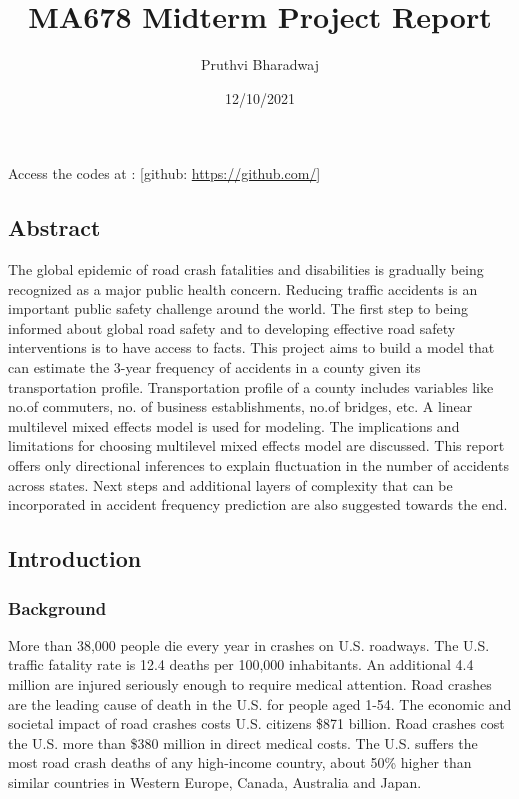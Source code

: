 \documentclass[
]{article}
\title{MA678 Midterm Project Report}
\author{Pruthvi Bharadwaj}
\date{12/10/2021}
\begin{document}
\maketitle

Access the codes at : {[}github: \url{https://github.com/}{]}

\hypertarget{abstract}{%
\subsection{Abstract}\label{abstract}}

The global epidemic of road crash fatalities and disabilities is
gradually being recognized as a major public health concern. Reducing
traffic accidents is an important public safety challenge around the
world. The first step to being informed about global road safety and to
developing effective road safety interventions is to have access to
facts. This project aims to build a model that can estimate the 3-year
frequency of accidents in a county given its transportation profile.
Transportation profile of a county includes variables like no.of
commuters, no. of business establishments, no.of bridges, etc. A linear
multilevel mixed effects model is used for modeling. The implications
and limitations for choosing multilevel mixed effects model are
discussed. This report offers only directional inferences to explain
fluctuation in the number of accidents across states. Next steps and
additional layers of complexity that can be incorporated in accident
frequency prediction are also suggested towards the end.

\hypertarget{introduction}{%
\subsection{Introduction}\label{introduction}}

\hypertarget{background}{%
\subsubsection{Background}\label{background}}

More than 38,000 people die every year in crashes on U.S. roadways. The
U.S. traffic fatality rate is 12.4 deaths per 100,000 inhabitants. An
additional 4.4 million are injured seriously enough to require medical
attention. Road crashes are the leading cause of death in the U.S. for
people aged 1-54. The economic and societal impact of road crashes costs
U.S. citizens \$871 billion. Road crashes cost the U.S. more than \$380
million in direct medical costs. The U.S. suffers the most road crash
deaths of any high-income country, about 50\% higher than similar
countries in Western Europe, Canada, Australia and Japan.
\end{document}
